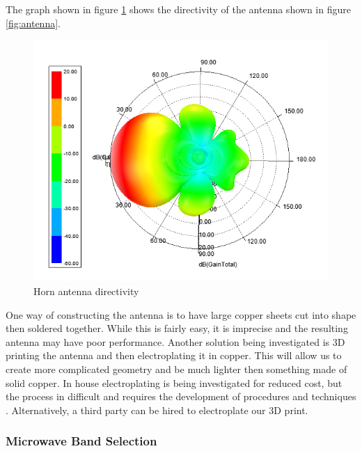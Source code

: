 \documentclass[12pt]{article}
\begin{document}
The graph shown in figure \ref{fig:antenna_direction} shows the directivity of the antenna shown in figure \ref{fig:antenna}.

\begin{figure}
	\centering
	\includegraphics[width=0.5\linewidth]{Figures/antenna_gain.png}
	\caption{Horn antenna directivity}
	\label{fig:antenna_direction}
\end{figure}

One way of constructing the antenna is to have large copper sheets cut into shape then soldered together. While this is fairly easy, it is imprecise and the resulting antenna may have poor performance. Another solution being investigated is 3D printing the antenna and then electroplating it in copper. This will allow us to create more complicated geometry and be much lighter then something made of solid copper. In house electroplating is being investigated for  reduced cost, but the process in difficult and requires the development of procedures and techniques \cite{bryancera2014}. Alternatively, a third party can be hired to electroplate our 3D print.

\subsubsection{Microwave Band Selection}
\end{document}
